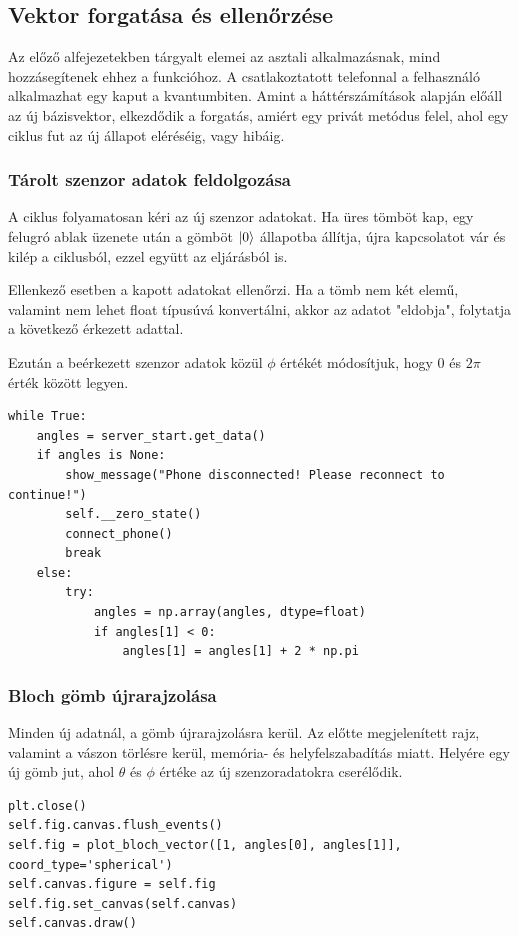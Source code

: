\documentclass[
]{thesis-ekf}
\theoremstyle{definition}
\theoremstyle{remark}
\begin{document}
\subsection{Vektor forgatása és ellenőrzése}
Az előző alfejezetekben tárgyalt elemei az asztali alkalmazásnak, mind hozzásegítenek ehhez a funkcióhoz. A csatlakoztatott telefonnal a felhasználó alkalmazhat egy kaput a kvantumbiten. Amint a háttérszámítások alapján előáll az új bázisvektor, elkezdődik a forgatás, amiért egy privát metódus felel, ahol egy ciklus fut az új állapot eléréséig, vagy hibáig.

\subsubsection{Tárolt szenzor adatok feldolgozása}
A ciklus folyamatosan kéri az új szenzor adatokat. Ha üres tömböt kap, egy felugró ablak üzenete után a gömböt $\ket{0}$ állapotba állítja, újra kapcsolatot vár és kilép a ciklusból, ezzel együtt az eljárásból is.

Ellenkező esetben a kapott adatokat ellenőrzi. Ha a tömb nem két elemű, valamint nem lehet float típusúvá konvertálni, akkor az adatot "eldobja", folytatja a következő érkezett adattal.

Ezután a beérkezett szenzor adatok közül $\phi$ értékét módosítjuk, hogy 0 és $2\pi$ érték között legyen.

\begin{lstlisting}[caption={Tárolt szenzor adatok feldolgozása}]
while True:
	angles = server_start.get_data()
	if angles is None:
		show_message("Phone disconnected! Please reconnect to continue!")
		self.__zero_state()
		connect_phone()
		break
	else:
		try:
			angles = np.array(angles, dtype=float)
			if angles[1] < 0:
				angles[1] = angles[1] + 2 * np.pi
\end{lstlisting}

\subsubsection{Bloch gömb újrarajzolása}
Minden új adatnál, a gömb újrarajzolásra kerül. Az előtte megjelenített rajz, valamint a vászon törlésre kerül, memória- és helyfelszabadítás miatt. Helyére egy új gömb jut, ahol $\theta$ és $\phi$ értéke az új szenzoradatokra cserélődik.

\begin{lstlisting}[caption={Bloch gömb újrarajzolása}]
plt.close()
self.fig.canvas.flush_events()
self.fig = plot_bloch_vector([1, angles[0], angles[1]], coord_type='spherical')
self.canvas.figure = self.fig
self.fig.set_canvas(self.canvas)
self.canvas.draw()
\end{lstlisting}
\end{document}
